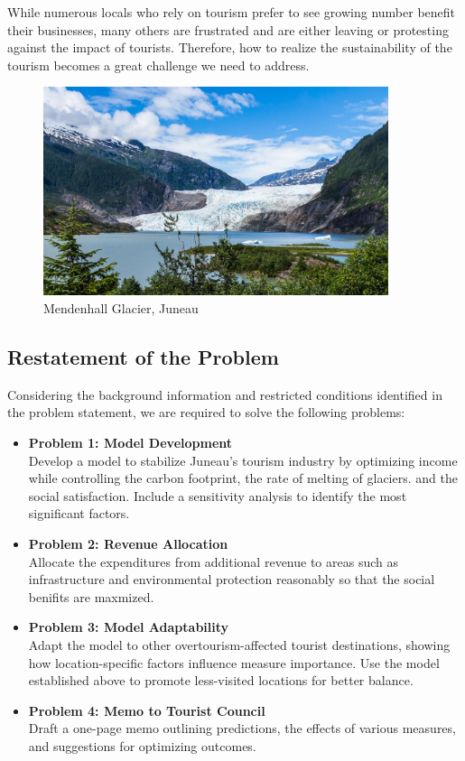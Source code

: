 \documentclass{mcmthesis}
\begin{document}
While numerous locals who rely on tourism prefer to see growing number benefit their businesses, many others are frustrated and are either leaving or protesting against the impact of tourists. 
Therefore, how to realize the sustainability of the tourism becomes a great challenge we need to address.

\begin{figure}[H]
  \centering
  \includegraphics[width=0.9\textwidth]{figures/glaicer.jpg}
  \caption{Mendenhall Glacier, Juneau}
  \label{Fig.1}
\end{figure}
\subsection{Restatement of the Problem}
Considering the background information and restricted conditions identified in the problem statement, we are required to solve the following problems:
\begin{itemize}
  \item \textbf{Problem 1: Model Development} \\
    Develop a model to stabilize Juneau's tourism industry by optimizing income while controlling the carbon footprint, the rate of melting of glaciers. 
    and the social satisfaction. Include a sensitivity analysis to identify the most significant factors.
    
  \item \textbf{Problem 2: Revenue Allocation} \\
    Allocate the expenditures from additional revenue to areas such as infrastructure and environmental protection reasonably so that the social benifits are maxmized.
    
  \item \textbf{Problem 3: Model Adaptability} \\
    Adapt the model to other overtourism-affected tourist destinations, showing how location-specific factors influence measure importance. 
    Use the model established above to promote less-visited locations for better balance.
    
  \item \textbf{Problem 4: Memo to Tourist Council} \\
    Draft a one-page memo outlining predictions, the effects of various measures, and suggestions for optimizing outcomes.
\end{itemize}
\end{document}
